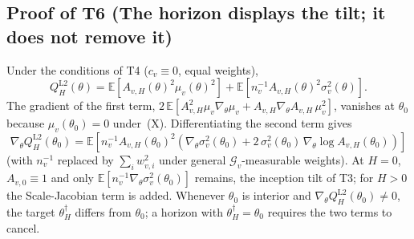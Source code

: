 \subsection{Proof of T6 (The horizon displays the tilt; it does not remove it)}
\label{sec:proof_T6}

Under the conditions of T4 ($c_v \equiv 0$, equal weights),
\[
Q_H^{\mathrm{L2}}(\theta) = \mathbb{E}[A_{v,H}(\theta)^2\mu_v(\theta)^2] + \mathbb{E}[n_v^{-1}A_{v,H}(\theta)^2\sigma_v^2(\theta)].
\]
The gradient of the first term, $2\,\mathbb{E}[A_{v,H}^2\mu_v\nabla_\theta\mu_v + A_{v,H}\nabla_\theta A_{v,H}\,\mu_v^2]$, vanishes at $\theta_0$ because $\mu_v(\theta_0) = 0$ under~(X). Differentiating the second term gives
\[
\nabla_\theta Q_H^{\mathrm{L2}}(\theta_0)
= \mathbb{E}\!\left[n_v^{-1}A_{v,H}(\theta_0)^2\left(\nabla_\theta\sigma_v^2(\theta_0) + 2\,\sigma_v^2(\theta_0)\,\nabla_\theta\log A_{v,H}(\theta_0)\right)\right]
\]
(with $n_v^{-1}$ replaced by $\sum_i w_{v,i}^2$ under general $\mathcal{G}_v$-measurable weights). At $H = 0$, $A_{v,0} \equiv 1$ and only $\mathbb{E}[n_v^{-1}\nabla_\theta\sigma_v^2(\theta_0)]$ remains, the inception tilt of T3; for $H > 0$ the Scale-Jacobian term is added. Whenever $\theta_0$ is interior and $\nabla_\theta Q_H^{\mathrm{L2}}(\theta_0) \neq 0$, the target $\theta_H^\dagger$ differs from $\theta_0$; a horizon with $\theta_H^\dagger = \theta_0$ requires the two terms to cancel.

